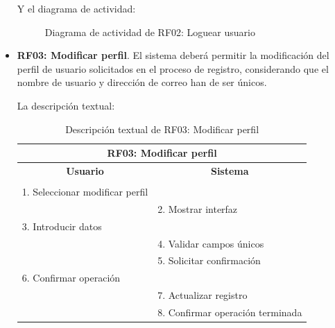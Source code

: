 \begin{itemize}
	Y el diagrama de actividad:
	\begin{figure}[!htb]
		\centering
		\caption{Diagrama de actividad de RF02: Loguear usuario}
		\label{fig:diagramaActividad_RF02}
	\end{figure}

	\FloatBarrier
	\item \textbf{RF03: Modificar perfil}. El sistema deberá permitir la modificación del perfil de usuario solicitados en el proceso de registro, considerando que el nombre de usuario y dirección de correo han de ser únicos.
	
	La descripción textual:
	\begin{table}[h]
		\centering	
		\begin{tabular}{|l|l|}
			\hline
			\multicolumn{2}{|c|}{\textbf{RF03: Modificar perfil}} \\ \hline
			\multicolumn{1}{|c|}{\textbf{Usuario}} & \multicolumn{1}{c|}{\textbf{Sistema}} \\ \hline
			[Pto. inclusión: RF02: Loguear usuario] &\\ \hline
			1. Seleccionar modificar perfil &\\ \hline
			& 2. Mostrar interfaz\\ \hline
			3. Introducir datos &\\ \hline
			& 4. Validar campos únicos\\ \hline
			& 5. Solicitar confirmación\\ \hline
			6. Confirmar operación &\\ \hline
			& 7. Actualizar registro \\ \hline
			& 8. Confirmar operación terminada \\ \hline 
		\end{tabular}
		\caption{Descripción textual de RF03: Modificar perfil}
		\label{tab:tablaDescTextualRF03}
	\end{table}
	

\end{itemize}
